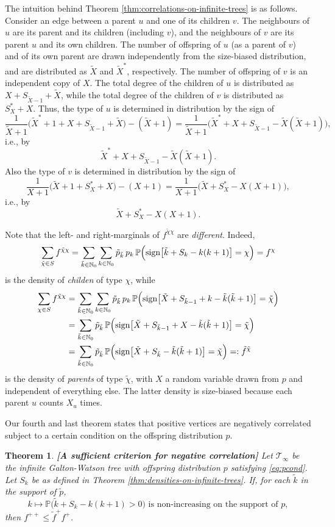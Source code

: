 \documentclass[11pt]{article}
\numberwithin{equation}{section}
\theoremstyle{plain}
\newtheorem{theorem}{Theorem}[section]
\newcommand{\N}{\mathbb N}
\newcommand{\PP}{\mathbb{P}}
\newcommand{\tX}{\tilde{X}}
\newcommand{\tk}{\tilde{k}}
\newcommand{\tchi}{{\tilde{\chi}}}
\newcommand{\tf}{{\tilde{f}}}
\begin{document}
The intuition behind Theorem \ref{thm:correlations-on-infinite-trees} is as follows. Consider an edge between a parent $u$ and one of its children $v$. The neighbours of $u$ are its parent and its children (including $v$), and the neighbours of $v$ are its parent $u$ and its own children. The number of offspring of $u$ (as a parent of $v$) and of its own parent are drawn independently from the size-biased distribution, and are distributed as $\tX$ and $\tX^*$, respectively. The number of offspring of $v$ is an independent copy of $X$. The total degree of the children of $u$ is distributed as $X + S_{\tX-1}+\tX$, while the total degree of the children of $v$ is distributed as $S_X^*+X$. Thus, the type of $u$ is determined in distribution by the sign of
\[
\frac{1}{\tX+1}\big(\tX^*+1+X+{S}_{\tX-1}+\tX\big)-(\tX+1)
= \dfrac{1}{\tX+1}\big(\tX^*+X+{S}_{\tX-1}-\tX(\tX+1)\big),
\]
i.e., by 
\[
\tX^*+X+{S}_{\tX-1}-\tX(\tX+1).
\]
Also the type of $v$ is determined in distribution by the sign of 
\[
\frac{1}{X+1}\big(\tX+1+S_X^*+X \big)-(X+1) 
= \frac{1}{X+1}\big(\tX+S_X^* -X(X+1)\big),
\]
i.e., by 
\[
\tX+S_X^* -X(X+1).
\]

Note that the left- and right-marginals of $f^{\tchi\chi}$ are \emph{different}. Indeed, 
\[
\sum_{\tchi\in S}f^{\tchi\chi} = \sum_{\tk\in\N_0} \sum_{k\in\N_0} \tilde{p}_{\tilde{k}}\, p_k\,
\PP\Big({\rm sign}\big[\tilde{k}+S_k-k(k+1)\big]=\chi\Big) = f^\chi
\]
is the density of \emph{childen} of type $\chi$, while 
\begin{align*}
\sum_{\chi\in S} f^{\tchi\chi}
&=\sum_{\tk\in\N_0}\sum_{k\in\N_0} \tilde{p}_{\tilde{k}}\, p_k\,
\PP\Big({\rm sign}\big[\tX+{S}_{\tilde{k}-1}+k-\tilde{k}(\tilde{k}+1)\big]=\tchi\Big)\\
&=\sum_{\tk\in\N_0} \tilde{p}_{\tilde{k}}\,
\PP\Big({\rm sign}\big[\tX+{S}_{\tilde{k}-1}+X-\tilde{k}(\tilde{k}+1)\big]=\tchi\Big)\\
&= \sum_{\tk\in\N_0}  \tilde{p}_{\tilde{k}}\,
\PP\Big({\rm sign}\big[\tX+{S}_{\tilde{k}}-\tilde{k}(\tilde{k}+1)\big]=\tchi\Big)
=: \tf^{\tchi}
\end{align*}
is the density of \emph{parents} of type $\tchi$, with $X$ a random variable drawn from $p$ and independent of everything else. The latter density is size-biased because each parent $u$ counts $X_u$ times. 

Our fourth and last theorem states that positive vertices are negatively correlated subject to a certain condition on the offspring distribution $p$.

\begin{theorem}{\bf [A sufficient criterion for negative correlation]}
\label{thm:plusplus-correlations-on-infinite-trees}
Let $\mathcal{T}_\infty$ be the infinite Galton-Watson tree with offspring distribution $p$ satisfying \eqref{eq:pcond}. Let $S_k$ be as defined in Theorem \ref{thm:densities-on-infinite-trees}. If, for each $\tk$ in the support of $\tilde{p}$, 
\begin{equation}
\label{eq:mono}
k \mapsto \PP\big(\tk + S_k - k(k+1)>0\big) \text{ is non-increasing on the support of $p$},
\end{equation}
then $f^{++} \leq \tf^+ f^+$.
\end{theorem}
\end{document}
